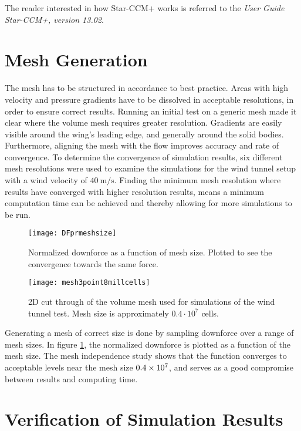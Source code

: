   The reader interested in how Star-CCM+ works is referred to the \emph{User Guide Star-CCM+, version 13.02}.

\section{Mesh Generation}
\label{sec:mesh}

  The mesh has to be structured in accordance to best practice. Areas with high velocity and pressure gradients have to be dissolved in acceptable resolutions, in order to ensure correct results. Running an initial test on a generic mesh made it clear where the volume mesh requires greater resolution. Gradients are easily visible around the wing's leading edge, and generally around the solid bodies. Furthermore, aligning the mesh with the flow improves accuracy and rate of convergence. To determine the convergence of simulation results, six different mesh resolutions were used to examine the simulations for the wind tunnel setup with a wind velocity of $\SI{40}{\metre\per\second}$. Finding the minimum mesh resolution where results have converged with higher resolution results, means a minimum computation time can be achieved and thereby allowing for more simulations to be run.

  \begin{figure}
    \texttt{[image: DFprmeshsize]}
    \caption{Normalized downforce as a function of mesh size. Plotted to see the convergence towards the same force.}
    \label{fig:DFprmeshsize}
  \end{figure}

  \begin{figure}
    \texttt{[image: mesh3point8millcells]}
    \caption{2D cut through of the volume mesh used for simulations of the wind tunnel test. Mesh size is approximately $0.4 \cdot 10^{7}$ cells.}
    \label{fig:mesh3point8mill}
  \end{figure}

  Generating a mesh of correct size is done by sampling downforce over a range of mesh sizes. In figure \ref{fig:DFprmeshsize}, the normalized downforce is plotted as a function of the mesh size. The mesh independence study shows that the function converges to acceptable levels near the mesh size $\SI{.4E7}{}$, and serves as a good compromise between results and computing time.

  \section{Verification of Simulation Results}
  \label{sec:simulationcomparison}

